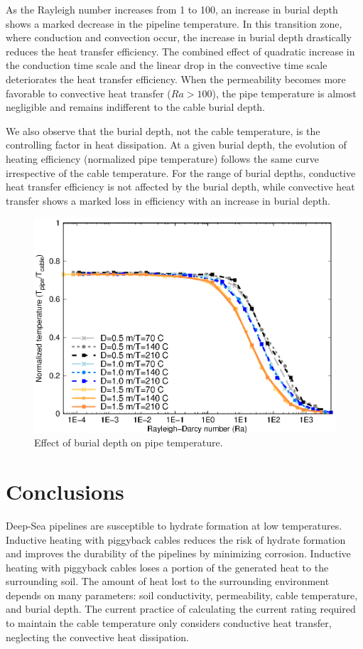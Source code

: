 \documentclass[Journal,letterpaper,InsideFigs]{ascelike-new}
\begin{document}
As the Rayleigh number increases from 1 to 100, an increase in burial depth shows a marked decrease in the pipeline temperature. In this transition zone, where conduction and convection occur, the increase in burial depth drastically reduces the heat transfer efficiency. The combined effect of quadratic increase in the conduction time scale and the linear drop in the convective time scale deteriorates the heat transfer efficiency. When the permeability becomes more favorable to convective heat transfer ($Ra > 100$), the pipe temperature is almost negligible and remains indifferent to the cable burial depth.

We also observe that the burial depth, not the cable temperature, is the controlling factor in heat dissipation. At a given burial depth, the evolution of heating efficiency (normalized pipe temperature) follows the same curve irrespective of the cable temperature. For the range of burial depths, conductive heat transfer efficiency is not affected by the burial depth, while convective heat transfer shows a marked loss in efficiency with an increase in burial depth.

\begin{figure}
    \centering
    \includegraphics{figs/ra-tnorm-depth.eps}
    \caption{Effect of burial depth on pipe temperature.}
    \label{fig:ra-tnorm-depth}
\end{figure}

\section{Conclusions}

Deep-Sea pipelines are susceptible to hydrate formation at low temperatures. Inductive heating with piggyback cables reduces the risk of hydrate formation and improves the durability of the pipelines by minimizing corrosion. Inductive heating with piggyback cables loses a portion of the generated heat to the surrounding soil. The amount of heat lost to the surrounding environment depends on many parameters: soil conductivity, permeability, cable temperature, and burial depth. The current practice of calculating the current rating required to maintain the cable temperature only considers conductive heat transfer, neglecting the convective heat dissipation. 
\end{document}
